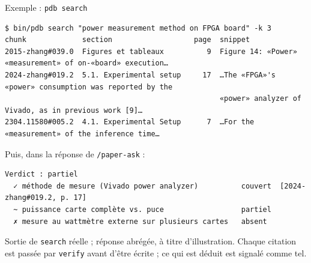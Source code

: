 \documentclass[aspectratio=169,11pt]{beamer}
\newcommand{\cmd}[1]{\texttt{\textcolor{blu}{#1}}}
\begin{document}
\begin{frame}[fragile]{Exemple : \texttt{pdb search}}
\begin{lstlisting}
$ bin/pdb search "power measurement method on FPGA board" -k 3
chunk             section                   page  snippet
2015-zhang#039.0  Figures et tableaux          9  Figure 14: «Power» «measurement» of on-«board» execution…
2024-zhang#019.2  5.1. Experimental setup     17  …The «FPGA»'s «power» consumption was reported by the
                                                  «power» analyzer of Vivado, as in previous work [9]…
2304.11580#005.2  4.1. Experimental Setup      7  …For the «measurement» of the inference time…
\end{lstlisting}
\vspace{0.3em}
Puis, dans la réponse de \cmd{/paper-ask} :
\begin{lstlisting}
Verdict : partiel
  ✓ méthode de mesure (Vivado power analyzer)          couvert  [2024-zhang#019.2, p. 17]
  ~ puissance carte complète vs. puce                  partiel
  ✗ mesure au wattmètre externe sur plusieurs cartes   absent
\end{lstlisting}
{\scriptsize Sortie de \cmd{search} réelle ; réponse abrégée, à titre d'illustration. Chaque citation est passée par \cmd{verify} avant d'être écrite ; ce qui est déduit est signalé comme tel.}
\end{frame}
\end{document}
